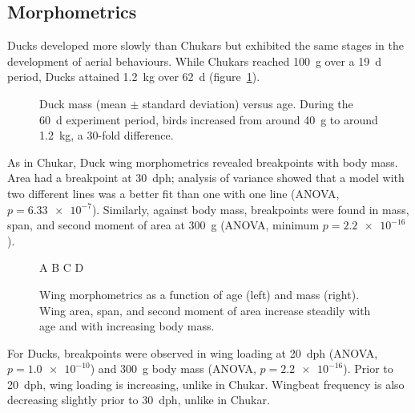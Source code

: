 \documentclass[10pt]{article}
\begin{document}
\subsection{Morphometrics}
Ducks developed more slowly than Chukars but exhibited the same stages in the development of aerial behaviours.  While Chukars reached \SI{100}{\gram} over a \SI{19}{\day} period, Ducks attained \SI{1.2}{\kilo\gram} over \SI{62}{\day} (figure~\ref{fig:duckmass}). 
\begin{figure}
\begin{center}
\end{center}
\caption{Duck mass (mean $\pm$ standard deviation) versus age.  During the \SI{60}{\day} experiment period, birds increased from around \SI{40}{\gram} to around \SI{1.2}{\kilo\gram}, a 30-fold difference.}
\label{fig:duckmass}
\end{figure}
	As in Chukar, Duck wing morphometrics revealed breakpoints with body mass.  Area had a breakpoint at \SI{30}{dph}; analysis of variance showed that a model with two different lines was a better fit than one with one line (ANOVA, $p=\num{6.33e-7}$).  Similarly, against body mass, breakpoints were found in mass, span, and second moment of area at \SI{300}{\gram} (ANOVA, minimum $p=\num{2.2e-16}$). 
\begin{figure}
\begin{center}
A %
B %
C %
D %
\end{center}
\caption{Wing morphometrics as a function of age (left) and mass (right).  Wing area, span, and second moment of area increase steadily with age and with increasing body mass.}
\label{fig:duckmorphometrics}
\end{figure}
	For Ducks, breakpoints were observed in wing loading at \SI{20}{dph} (ANOVA, $p=\num{1.0e-10}$) and \SI{300}{\gram} body mass (ANOVA, $p=\num{2.2e-16}$).  Prior to \SI{20}{dph}, wing loading is increasing, unlike in Chukar.  Wingbeat frequency is also decreasing slightly prior to \SI{30}{dph}, unlike in Chukar. 
\end{document}

